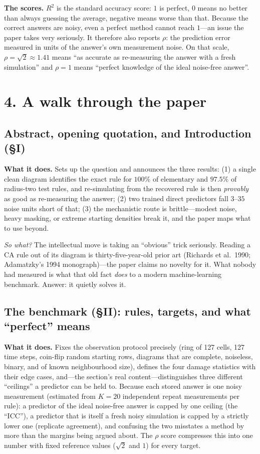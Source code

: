 \documentclass[11pt,a4paper]{article}
\newcommand{\sowhat}[1]{\emph{So what?} #1}
\begin{document}
\textbf{The scores.} $R^2$ is the standard accuracy score: $1$ is perfect,
$0$ means no better than always guessing the average, negative means worse
than that. Because the correct answers are noisy, even a perfect method
cannot reach $1$---an issue the paper takes very seriously. It therefore
also reports $\rho$: the prediction error measured in units of the answer's
own measurement noise. On that scale, $\rho=\sqrt2\approx1.41$ means ``as
accurate as re-measuring the answer with a fresh simulation'' and $\rho=1$
means ``perfect knowledge of the ideal noise-free answer''.

\section*{4. A walk through the paper}

\subsection*{Abstract, opening quotation, and Introduction (\S I)}

\textbf{What it does.} Sets up the question and announces the three results:
(1) a single clean diagram identifies the exact rule for $100\%$ of
elementary and $97.5\%$ of radius-two test rules, and re-simulating from the
recovered rule is then \emph{provably} as good as re-measuring the answer;
(2) two trained direct predictors fall $3$--$35$ noise units short of that;
(3) the mechanistic route is brittle---modest noise, heavy masking, or
extreme starting densities break it, and the paper maps what to use beyond.

\sowhat{The intellectual move is taking an ``obvious'' trick seriously.
Reading a CA rule out of its diagram is thirty-five-year-old prior art
(Richards et al.\ 1990; Adamatzky's 1994 monograph)---the paper claims no
novelty for it. What nobody had measured is what that old fact \emph{does}
to a modern machine-learning benchmark. Answer: it quietly solves it.}

\subsection*{The benchmark (\S II): rules, targets, and what ``perfect'' means}

\textbf{What it does.} Fixes the observation protocol precisely (ring of
127 cells, 127 time steps, coin-flip random starting rows, diagrams that are
complete, noiseless, binary, and of known neighbourhood size), defines the
four damage statistics with their edge cases, and---the section's real
content---distinguishes three different ``ceilings'' a predictor can be held
to. Because each stored answer is one noisy measurement (estimated from
$K=20$ independent repeat measurements per rule): a predictor of the ideal
noise-free answer is capped by one ceiling (the ``ICC''), a predictor that
is itself a fresh noisy simulation is capped by a strictly lower one
(replicate agreement), and confusing the two misstates a method by more than
the margins being argued about. The $\rho$ score compresses this into one
number with fixed reference values ($\sqrt2$ and $1$) for every target.
\end{document}
